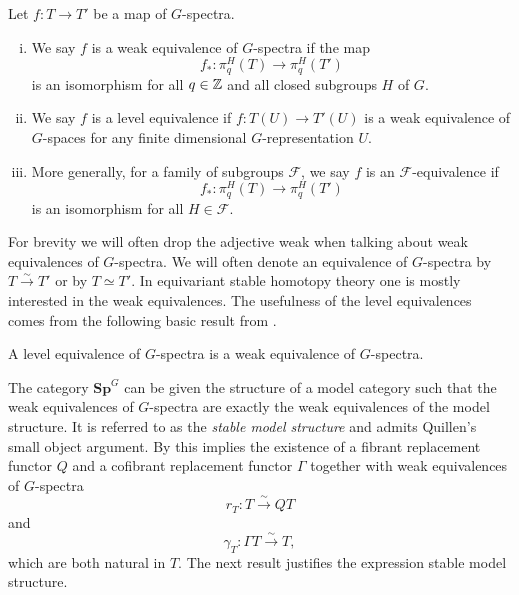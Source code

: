\begin{mydef}
Let $f:T\to T'$ be a map of $G$-spectra.
\begin{enumerate}[(i)]
\item We say $f$ is a weak equivalence of $G$-spectra
if the map
\[
f_\ast:\pi_q^H(T)\to \pi_q^H(T')
\]
is an isomorphism for all $q\in \mathbb{Z}$ and all closed subgroups $H$
of $G$.
\item We say $f$ is a level equivalence if $f:T(U)\to T'(U)$
is a weak equivalence of $G$-spaces for any finite dimensional
$G$-representation $U$.
\item More generally, for a family of subgroups $\mathcal{F}$,
we say $f$ is an $\mathcal{F}$-equivalence if
\[
f_\ast:\pi_q^H(T)\to \pi_q^H(T')
\] 
is an isomorphism for all $H\in \mathcal{F}$.
\end{enumerate}
\end{mydef}
For brevity we will often drop the adjective weak when
talking about weak equivalences of $G$-spectra.
We will often denote an equivalence of $G$-spectra by
$T\xrightarrow{\sim} T'$ or by $T\simeq T'$. In equivariant
stable homotopy theory one is mostly interested in the weak
equivalences. The usefulness of the level equivalences comes
from the following basic result from \cite[Lemma~III.3.3, \pno~45]{mandellmay}.
\begin{lem}
A level equivalence of $G$-spectra is a weak equivalence of $G$-spectra.
\end{lem}

The category $\mathbf{Sp}^G$ can be given the structure of a model
category \cite[Theorem~III.4.2, \pno~47]{mandellmay} such that the weak equivalences
of $G$-spectra are exactly the weak equivalences of the model structure. 
It is referred to as the \textit{stable model structure}
and admits Quillen's
small object argument. By \cite[Theorem~2.1.14, \pno~33]{hoveymodelcats} 
this implies the existence of a fibrant replacement 
functor $Q$ and a cofibrant replacement functor $\Gamma$
together with weak equivalences of $G$-spectra
\[
r_T: T\xrightarrow{\sim} QT
\]
and
\[
\gamma_T:\Gamma T\xrightarrow{\sim} T,
\]
which are both natural in $T$. The next result justifies the expression
stable model structure.


